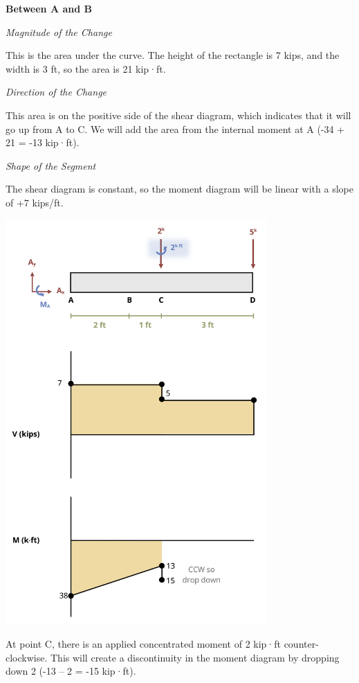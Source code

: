 \documentclass[
  letterpaper,
  DIV=11,
  numbers=noendperiod]{scrreprt}
\begin{document}
\begin{tcolorbox}
\begin{tcolorbox}
\textbf{Between A and B}

\emph{Magnitude of the Change}

This is the area under the curve. The height of the rectangle is 7 kips,
and the width is 3 ft, so the area is 21 kip·ft.

\emph{Direction of the Change}

This area is on the positive side of the shear diagram, which indicates
that it will go up from A to C. We will add the area from the internal
moment at A (-34 + 21 = -13 kip·ft).

\emph{Shape of the Segment}

The shear diagram is constant, so the moment diagram will be linear with
a slope of +7 kips/ft.

\begin{center}
\includegraphics[width=3.92708in,height=\textheight]{images/CH7 PNGs/example 7.4 part 5.png}
\end{center}

At point C, there is an applied concentrated moment of 2 kip·ft
counter-clockwise. This will create a discontinuity in the moment
diagram by dropping down 2 (-13 -- 2 = -15 kip·ft).


\end{tcolorbox}
\end{tcolorbox}
\end{document}
